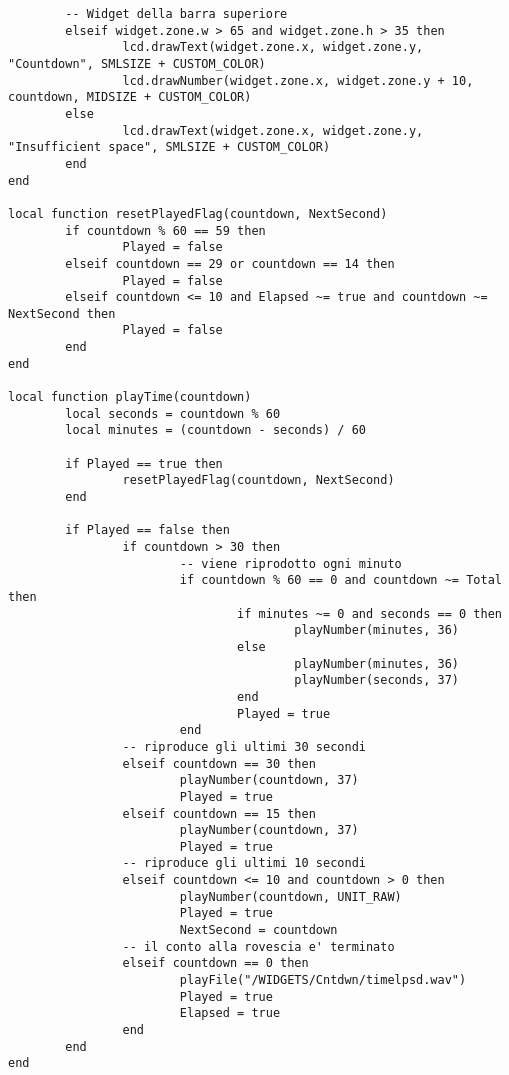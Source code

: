 \begin{lstlisting}
        -- Widget della barra superiore
        elseif widget.zone.w > 65 and widget.zone.h > 35 then
                lcd.drawText(widget.zone.x, widget.zone.y, "Countdown", SMLSIZE + CUSTOM_COLOR)
                lcd.drawNumber(widget.zone.x, widget.zone.y + 10, countdown, MIDSIZE + CUSTOM_COLOR)
        else
                lcd.drawText(widget.zone.x, widget.zone.y, "Insufficient space", SMLSIZE + CUSTOM_COLOR)
        end
end

local function resetPlayedFlag(countdown, NextSecond)
        if countdown % 60 == 59 then
                Played = false
        elseif countdown == 29 or countdown == 14 then
                Played = false
        elseif countdown <= 10 and Elapsed ~= true and countdown ~= NextSecond then
                Played = false
        end
end

local function playTime(countdown)
        local seconds = countdown % 60 
        local minutes = (countdown - seconds) / 60

        if Played == true then
                resetPlayedFlag(countdown, NextSecond)
        end

        if Played == false then
                if countdown > 30 then
                        -- viene riprodotto ogni minuto
                        if countdown % 60 == 0 and countdown ~= Total then
                                if minutes ~= 0 and seconds == 0 then
                                        playNumber(minutes, 36)
                                else
                                        playNumber(minutes, 36)
                                        playNumber(seconds, 37)
                                end
                                Played = true
                        end
                -- riproduce gli ultimi 30 secondi
                elseif countdown == 30 then
                        playNumber(countdown, 37)
                        Played = true
                elseif countdown == 15 then
                        playNumber(countdown, 37)
                        Played = true
                -- riproduce gli ultimi 10 secondi
                elseif countdown <= 10 and countdown > 0 then
                        playNumber(countdown, UNIT_RAW)
                        Played = true
                        NextSecond = countdown
                -- il conto alla rovescia e' terminato
                elseif countdown == 0 then
                        playFile("/WIDGETS/Cntdwn/timelpsd.wav")
                        Played = true
                        Elapsed = true
                end
        end
end


\end{lstlisting}
